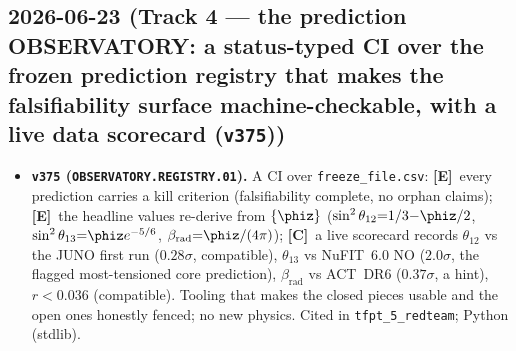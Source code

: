 \documentclass[11pt]{article}
\providecommand{\mE}{\textbf{[E]}}\providecommand{\mC}{\textbf{[C]}}
\begin{document}
\subsection*{2026-06-23 (Track 4 --- the prediction OBSERVATORY: a status-typed CI over the frozen prediction registry that makes the falsifiability surface machine-checkable, with a live data scorecard (\texttt{v375}))}
\begin{itemize}
\item \textbf{\texttt{v375} (\texttt{OBSERVATORY.REGISTRY.01}).} A CI over \texttt{freeze\_file.csv}: \mE\ every
prediction carries a kill criterion (falsifiability complete, no orphan claims); \mE\ the headline values
re-derive from $\{\phiz\}$ ($\sin^2\theta_{12}{=}1/3{-}\phiz/2$, $\sin^2\theta_{13}{=}\phiz e^{-5/6}$,
$\beta_{\mathrm{rad}}{=}\phiz/(4\pi)$); \mC\ a live scorecard records $\theta_{12}$ vs the JUNO first run
($0.28\sigma$, compatible), $\theta_{13}$ vs NuFIT~6.0 NO ($2.0\sigma$, the flagged most-tensioned core
prediction), $\beta_{\mathrm{rad}}$ vs ACT~DR6 ($0.37\sigma$, a hint), $r<0.036$ (compatible). Tooling that
makes the closed pieces usable and the open ones honestly fenced; no new physics. Cited in
\texttt{tfpt\_5\_redteam}; Python (stdlib).
\end{itemize}
\end{document}
